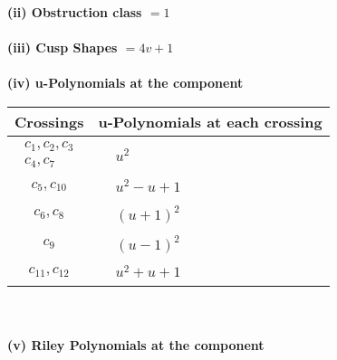 \documentclass[1p]{elsarticle_modified}
\theoremstyle{definition}
\begin{document}
\flushleft \textbf{(ii) Obstruction class $= 1$}\\~\\
\flushleft \textbf{(iii) Cusp Shapes $= 4 v+1$}\\~\\
\newpage\renewcommand{\arraystretch}{1}
\flushleft \textbf{(iv) u-Polynomials at the component}\newline \\
\begin{tabular}{m{50pt}|m{274pt}}
Crossings & \hspace{64pt}u-Polynomials at each crossing \\
\hline $$\begin{aligned}c_{1},c_{2},c_{3}\\c_{4},c_{7}\end{aligned}$$&$\begin{aligned}
&u^2
\end{aligned}$\\
\hline $$\begin{aligned}c_{5},c_{10}\end{aligned}$$&$\begin{aligned}
&u^2- u+1
\end{aligned}$\\
\hline $$\begin{aligned}c_{6},c_{8}\end{aligned}$$&$\begin{aligned}
&(u+1)^2
\end{aligned}$\\
\hline $$\begin{aligned}c_{9}\end{aligned}$$&$\begin{aligned}
&(u-1)^2
\end{aligned}$\\
\hline $$\begin{aligned}c_{11},c_{12}\end{aligned}$$&$\begin{aligned}
&u^2+u+1
\end{aligned}$\\
\hline
\end{tabular}\\~\\
\newpage\renewcommand{\arraystretch}{1}
\flushleft \textbf{(v) Riley Polynomials at the component}\newline \\
\end{document}
